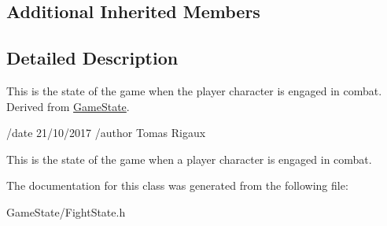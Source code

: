 \subsection*{Additional Inherited Members}


\subsection{Detailed Description}
This is the state of the game when the player character is engaged in combat. Derived from \hyperlink{classGameState}{Game\-State}. 

/date 21/10/2017 /author Tomas Rigaux

This is the state of the game when a player character is engaged in combat. 

The documentation for this class was generated from the following file\-:\begin{DoxyCompactItemize}
\item 
Game\-State/Fight\-State.\-h\end{DoxyCompactItemize}
